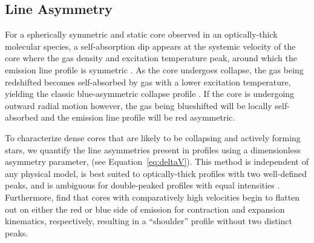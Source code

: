 \documentclass[iop,twocolappendix]{emulateapj}
\begin{document}

\subsection{Line Asymmetry}
\label{subsec:lineasymm}

For a spherically symmetric and static core observed in an optically-thick molecular species, a self-absorption dip appears at the systemic velocity of the core where the gas density and excitation temperature peak, around which the emission line profile is symmetric \citep{DeVries2005}. As the core undergoes collapse, the gas being redshifted becomes self-absorbed by gas with a lower excitation temperature, yielding the classic blue-asymmetric collapse profile \citep{Leung1977, DeVries2005}. If the core is undergoing outward radial motion however, the gas being blueshifted will be locally self-absorbed and the emission line profile will be red asymmetric. 

To characterize dense cores that are likely to be collapsing and actively forming stars, we quantify the line asymmetries present in {\HCO} profiles using a dimensionless asymmetry parameter, {\deltaV} (see Equation~\ref{eq:deltaV}). This method is independent of any physical model, is best suited to optically-thick profiles with two well-defined peaks, and is ambiguous for double-peaked profiles with equal intensities \citep{Mardones1997}. Furthermore, \citet{DeVries2005} find that cores with comparatively high velocities begin to flatten out on either the red or blue side of {\HCO} emission for contraction and expansion kinematics, respectively, resulting in a ``shoulder'' profile without two distinct peaks.
\end{document}

